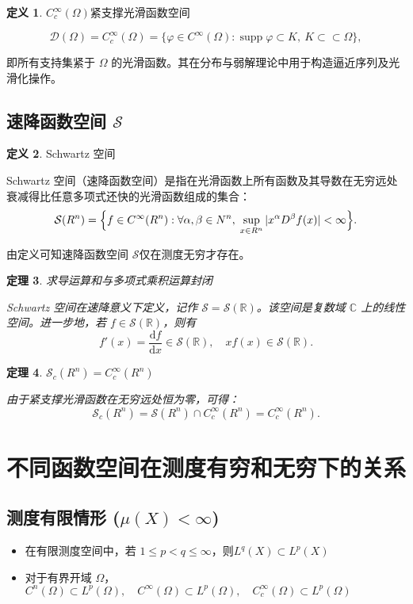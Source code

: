 \documentclass[12pt,a4paper]{article}
\newcommand{\R}{\mathbb{R}}                %
\newcommand{\N}{\mathbb{N}}                %
\DeclareMathOperator{\supp}{supp}          %
\def\R{R}%
\def\N{N}%
\theoremstyle{plain}
\newtheorem{theorem}{定理}[section]
\theoremstyle{definition}
\newtheorem{definition}[theorem]{定义}
\theoremstyle{remark}
\begin{document}
	\begin{definition}$C_c^\infty(\Omega)$紧支撑光滑函数空间

		\[
		\mathcal D(\Omega)=	C_c^\infty(\Omega)
		=\{\varphi\in C^\infty(\Omega):\supp\varphi\subset K,\ K\subset\subset\Omega\},
		\]
		
		
		即所有支持集紧于 $\Omega$ 的光滑函数。其在分布与弱解理论中用于构造逼近序列及光滑化操作。
		
	\end{definition}
	
	\subsection{速降函数空间 $\mathcal S$}
	
	\begin{definition}Schwartz 空间
		
		Schwartz 空间（速降函数空间）是指在光滑函数上所有函数及其导数在无穷远处衰减得比任意多项式还快的光滑函数组成的集合：
		\[
		\mathcal S(\R^n)
		=\Bigl\{f\in C^\infty(\R^n):
		\forall\alpha,\beta\in\N^n,\;\sup_{x\in\R^n}|x^\alpha D^\beta f(x)|<\infty\Bigr\}.
		\]
	\end{definition}
	
	由定义可知速降函数空间 $\mathcal S$仅在测度无穷才存在。
	
	
	
	  \begin{theorem}求导运算和与多项式乘积运算封闭
		
			Schwartz 空间在速降意义下定义，记作 \( \mathcal{S} = \mathcal{S}(\mathbb{R}) \)。该空间是复数域 \( \mathbb{C} \) 上的线性空间。进一步地，若 \( f \in \mathcal{S}(\mathbb{R}) \)，则有
		\[
		f'(x) = \frac{\mathrm{d}f}{\mathrm{d}x} \in \mathcal{S}(\mathbb{R}), \quad xf(x) \in \mathcal{S}(\mathbb{R}).
		\]
	\end{theorem}
	
\begin{theorem}$\mathcal S_c(\R^n)=C_c^\infty(\R^n)$
	
	
	由于紧支撑光滑函数在无穷远处恒为零，可得：
	\[
	\mathcal S_c(\R^n)
	=\mathcal S(\R^n)\cap C_c^\infty(\R^n)
	=C_c^\infty(\R^n).
	\]
	\end{theorem}
	
	\section{不同函数空间在测度有穷和无穷下的关系}
	
	\subsection{测度有限情形 ($\mu(X)<\infty$)}
	\begin{itemize}
\item		在有限测度空间中，若 $1\leq p<q\le\infty$，则$	L^q(X)\subset L^p(X)$
\item	对于有界开域 $\Omega$，$	C^n(\Omega)\subset L^p(\Omega),\quad
	C^\infty(\Omega)\subset L^p(\Omega),\quad
	C_c^\infty(\Omega)\subset L^p(\Omega)$
\end{itemize}
	
\end{document}
